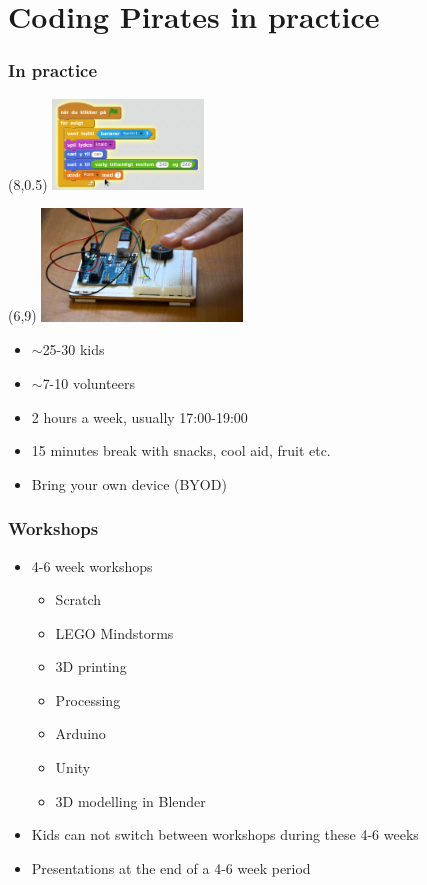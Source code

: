 \documentclass{beamer}
\begin{document}
\section{Coding Pirates in practice}
\begin{frame}
\frametitle{In practice}

\begin{textblock}{20}(8,0.5)
 \includegraphics[width=0.3\textwidth]{imagery/scratch}
\end{textblock}

\begin{textblock}{20}(6,9)
  \includegraphics[width=0.4\textwidth]{imagery/arduino-theremin}
\end{textblock}

\begin{itemize}
\item $\sim$25-30 kids
\item $\sim$7-10 volunteers
\item 2 hours a week, usually 17:00-19:00
\item 15 minutes break with snacks, cool aid, fruit etc.
\item Bring your own device (BYOD)
\end{itemize}
\vspace{2cm}

\end{frame}

\begin{frame}
\frametitle{Workshops}

\begin{itemize}
\item 4-6 week workshops
  \begin{itemize}
  \item Scratch
  \item LEGO Mindstorms
  \item 3D printing
  \item Processing
  \item Arduino
  \item Unity
  \item 3D modelling in Blender
  \end{itemize}
\item Kids can not switch between workshops during these 4-6 weeks
\item Presentations at the end of a 4-6 week period
\end{itemize}

\end{frame}
\end{document}
